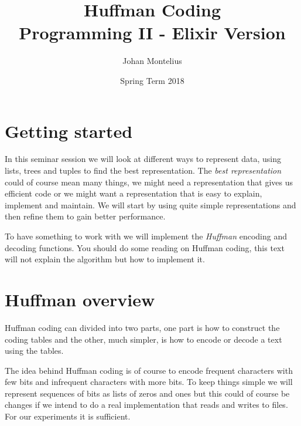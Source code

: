 \documentclass[a4paper,11pt]{article}
\begin{document}

\title{
    \textbf{Huffman Coding}\\
    \large{Programming II - Elixir Version}
}
\author{Johan Montelius}
\date{Spring Term 2018}
\maketitle
\thispagestyle{fancy}



\section*{Getting started}
In this seminar session we will look at different ways to represent
data, using lists, trees and tuples to find the best
representation. The {\em best representation} could of course mean
many things, we might need a representation that gives us efficient
code or we might want a representation that is easy to explain,
implement and maintain. We will start by using quite simple
representations and then refine them to gain better performance.

To have something to work with we will implement the {\em Huffman}
encoding and decoding functions. You should do some reading on Huffman
coding, this text will not explain the algorithm but how to implement it.



\section{Huffman overview}
Huffman coding can divided into two parts, one part is how to
construct the coding tables and the other, much simpler, is how to
encode or decode a text using the tables. 

The idea behind Huffman coding is of course to encode frequent
characters with few bits and infrequent characters with more bits. To
keep things simple we will represent sequences of bits as lists of
zeros and ones but this could of course be changes if we intend to do a
real implementation that reads and writes to files. For our
experiments it is sufficient.
\end{document}
